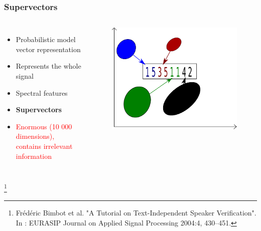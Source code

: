 \documentclass[11pt,english]{beamer}
\newcommand\blfootnote[1]{%
 \begingroup
  \renewcommand\thefootnote{}\footnote{#1}%
  \addtocounter{footnote}{-1}%
  \endgroup
}
\begin{document}
\begin{frame}
 \frametitle{Supervectors}
  \begin{columns}
    \begin{itemize}
    \item Probabilistic model vector representation
    \item Represents the whole signal
    \item Spectral features
    \item \textbf{Supervectors}

    \item \textcolor{red}{Enormous (10 000 dimensions), contains irrelevant information}
    \end{itemize}
    \begin{figure}
        \centering
       \includegraphics[scale = 0.5]{supervectors.pdf}
      \end{figure}
  \end{columns}
 \blfootnote{Frédéric Bimbot et al. "A Tutorial on Text-Independent Speaker Verification".  In : EURASIP Journal on Applied Signal Processing 2004:4, 430–451.}
  

\end{frame}
\end{document}
